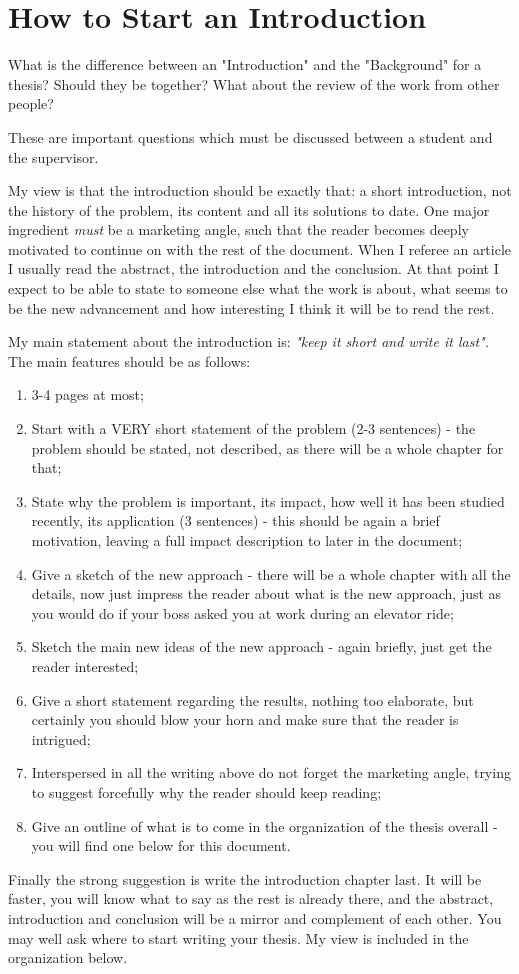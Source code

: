 \section{How to Start an Introduction}


What is the difference between an "Introduction" and the "Background" for a thesis? Should they be together? What about the review of the work from other people?

These are important questions which must be discussed between a student and the supervisor.

My view is that the introduction should be exactly that: a short introduction, not the history of the problem, its content and all its solutions to date. One major ingredient \textit{must} be a marketing angle, such that the reader becomes deeply motivated to continue on with the rest of the document. When I referee an article I usually read the abstract, the introduction and the conclusion. At that point I expect to be able to state to someone else what the work is about, what seems to be the new advancement and how interesting I think it will be to read the rest.

My main statement about the introduction is:
\textit{"keep it short and write it last".} The main features should be as follows:
\begin{enumerate}
\item {3-4 pages at most;}
\item {Start with a VERY short statement of the problem (2-3 sentences) - the problem should be stated, not described, as there will be a whole chapter for that;}
\item {State why the problem is important, its impact, how well it has been studied recently, its application (3 sentences) - this should be again a brief motivation, leaving a full impact description to later in the document;}
\item {Give a sketch of the new approach - there will be a whole chapter with all the details, now just impress the reader about what is the new approach, just as you would do if your boss asked you at work during an elevator ride;}
\item {Sketch the main new ideas of the new approach - again briefly, just get the reader interested;}
\item {Give a short statement regarding the results, nothing too elaborate, but certainly you should blow your horn and make sure that the reader is intrigued;}
\item {Interspersed in all the writing above do not forget the marketing angle, trying to suggest forcefully why the reader should keep reading;}
\item {Give an outline of what is to come in the organization of the thesis overall - you will find one below for this document.}

\end{enumerate}

Finally the strong suggestion is write the introduction chapter last. It will be faster, you will know what to say as the rest is already there, and the abstract, introduction and conclusion will be a mirror and complement of each other. You may well ask where to start writing your thesis. My view is included in the organization below.